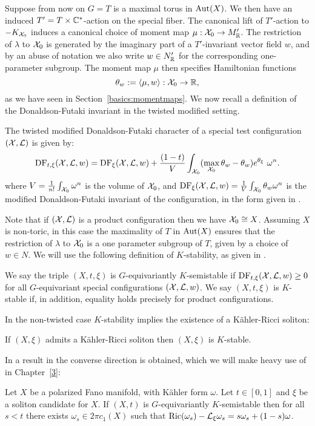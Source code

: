 Suppose from now on \(G = T\) is a maximal torus in \(\mathop{\rm Aut}\nolimits(X)\). We then have an induced \(T' = T \times \mathbb{C}^*\)-action on the special fiber. The canonical lift of \(T'\)-action to \(-K_{{\mathcal{X}}_0}\) induces a canonical choice of moment map \(\mu: {\mathcal{X}}_0 \to M_{\mathbb{R}}'\). The restriction of \(\lambda\) to \({\mathcal{X}}_0\) is generated by the imaginary part of a \(T'\)-invariant vector field \(w\), and by an abuse of notation we also write \(w \in N'_{\mathbb{R}}\) for the corresponding  one-parameter subgroup. The moment map \(\mu\) then specifies Hamiltonian functions
\[
\theta_w := \langle \mu, w \rangle: {\mathcal{X}}_0 \to \mathbb{R},
\]
as we have seen in Section~\ref{basics:momentmaps}. We now recall a definition of the Donaldson-Futaki invariant in the twisted modified setting.
\begin{definition}
The twisted modified Donaldson-Futaki character of a special test configuration \(({\mathcal{X}}, \mathcal{L}) \) is given by:
\[
\mathop{\rm DF}\nolimits_{t,\xi}({\mathcal{X}},\mathcal{L},w) = \mathop{\rm DF}\nolimits_{\xi}({\mathcal{X}},\mathcal{L},w) + \frac{(1-t)}{V} \int_{{\mathcal{X}}_0} ( \max_{{\mathcal{X}}_0} \theta_w - \theta_w)e^{\theta_\xi} \ \omega^n . 
\]
where \(V = \frac{1}{n!} \int_{{\mathcal{X}}_0} \omega^n\) is the volume of \({\mathcal{X}}_0\), and \(\mathop{\rm DF}\nolimits_\xi({\mathcal{X}},\mathcal{L},w) = \frac{1}{V} \int_{{\mathcal{X}}_0} \theta_w \omega^n\) is the modified Donaldson-Futaki invariant of the configuration, in the form given in \cite[Lemma 3.4]{berman2014complex}.
\end{definition}
Note that if \(({\mathcal{X}},\mathcal{L})\) is a product configuration then we have \({\mathcal{X}}_0 \cong X\). Assuming \(X\) is non-toric, in this case the maximality of \(T\) in \(\mathop{\rm Aut}\nolimits(X)\) ensures that the restriction of \(\lambda\) to \({\mathcal{X}}_0\) is a one parameter subgroup of \(T\), given by a choice of \(w \in N\). We will use the following definition of \(K\)-stability, as given in \cite{datar2016kahler}.
\begin{definition}
We say the triple  \((X,t,\xi)\) is \(G\)-equivariantly \(K\)-semistable if \( \mathop{\rm DF}\nolimits_{t,\xi}({\mathcal{X}},\mathcal{L},w) \ge 0\) for all \(G\)-equivariant special configurations \(({\mathcal{X}},\mathcal{L},w)\). We say \((X,t,\xi)\) is \(K\)-stable if, in addition, equality holds precisely for product configurations. 
\end{definition}
In the non-twisted case \(K\)-stability implies the existence of a K\"ahler-Ricci soliton:
\begin{theorem} \label{thm:BWN}
If \((X,\xi)\) admits a K\"ahler-Ricci soliton then \((X,\xi)\) is \(K\)-stable.
\end{theorem}
In \cite{datar2016kahler} a result in the converse direction is obtained, which we will make heavy use of in Chapter~\ref{3}:
\begin{theorem} \label{thm:DS}
Let \(X\) be a polarized Fano manifold, with K\"ahler form \(\omega\). Let \(t \in [0,1]\) and \(\xi\) be a soliton candidate for \(X\). If \((X,t)\) is \(G\)-equivariantly \(K\)-semistable then for all \(s <t\)  there exists \(\omega_s \in 2 \pi c_1(X)\) such that \(\mathop{\rm Ric}\nolimits(\omega_s) - \mathcal{L}_\xi \omega_s = s \omega_s + (1-s) \omega\).
\end{theorem}
